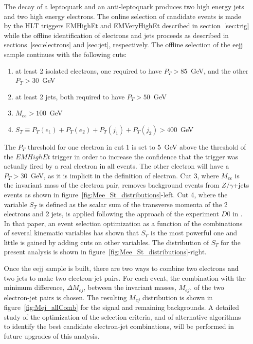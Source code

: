 The decay of a leptoquark and an anti-leptoquark produces two high energy jets and two high energy 
electrons.  
The online selection of candidate events is made by the HLT triggers EMHighEt and EMVeryHighEt 
described in section~\ref{sec:trig} while the offline identification of electrons and jets 
proceeds as described in sections~\ref{sec:electrons} and \ref{sec:jet}, respectively.
The offline selection of the eejj sample continues with the following cuts:
%
\begin{enumerate}
\item at least 2 isolated electrons, one required to have $P_T>85$~GeV, 
and the other $P_T>30$~GeV 
\item at least 2 jets, both required to have $P_T>50$~GeV
\item $M_{ee}>100$~GeV
\item $S_T\equiv P_T(e_1)+P_T(e_2)+P_T(j_1)+P_T(j_2)>400$~GeV
\end{enumerate}
%
The $P_T$ threshold for one electron in cut 1 is set to 5~GeV above the threshold of the $EMHighEt$ trigger 
in order to increase the confidence that the trigger was actually fired by a real electron in all events.
The other electron will have a $P_T>30$~GeV, as it is implicit in the definition of electron. 
Cut 3, where $M_{ee}$ is the invariant mass of the electron pair, removes background events from 
$Z/\gamma$+jets events as shown in figure~\ref{fig:Mee_St_distributions}-left.
Cut 4, where the variable $S_T$ is defined as the scalar sum of the transverse momenta of the 
2 electrons and 2 jets, is applied following the approach of the experiment $D0$ in 
\cite{Abazov:2001mx}. In that paper, an event selection optimization as a function of
the combinations of several kinematic variables has shown that $S_T$ is the most powerful one 
and little is gained by adding cuts on other variables. The distribution of $S_T$ for the present
analysis is shown in figure~\ref{fig:Mee_St_distributions}-right.

Once the eejj sample is built, there are two ways to combine two electrons and two jets to make two electron-jet pairs. 
For each event, the combination with the minimum difference, $\Delta M_{ej}$, between the invariant masses, $M_{ej}$, 
of the two electron-jet pairs is chosen. 
The resulting $M_{ej}$ distribution is shown in figure~\ref{fig:Mej_allComb} for the signal and remaining backgrounds. 
A detailed study of the optimization of the selection criteria, and of alternative algorithms to identify the best candidate 
electron-jet combinations, will be performed in future upgrades of this analysis.

